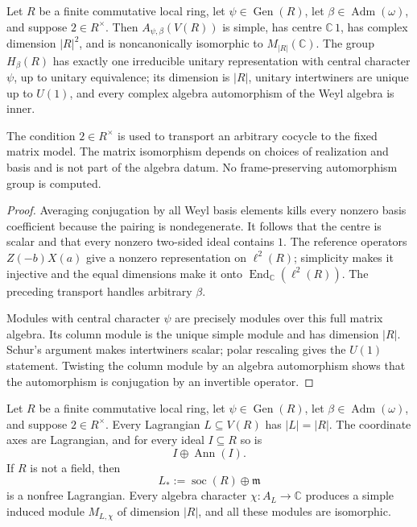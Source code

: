 \statusProvedConditional
\begin{theorem}
\label{thm:local-stone-von-neumann}
Let $R$ be a finite commutative local ring, let
$\psi\in\operatorname{Gen}(R)$, let
$\beta\in\operatorname{Adm}(\omega)$, and suppose $2\in R^\times$.  Then
$A_{\psi,\beta}(V(R))$ is simple, has centre $\mathbb C\,1$, has complex
dimension $|R|^2$, and is noncanonically isomorphic to
$M_{|R|}(\mathbb C)$.  The group $H_\beta(R)$ has exactly one irreducible
unitary representation with central character $\psi$, up to unitary
equivalence; its dimension is $|R|$, unitary intertwiners are unique up to
$U(1)$, and every complex algebra automorphism of the Weyl algebra is inner.
\end{theorem}

\begin{scope}
The condition $2\in R^\times$ is used to transport an arbitrary cocycle to
the fixed matrix model.  The matrix isomorphism depends on choices of
realization and basis and is not part of the algebra datum.  No
frame-preserving automorphism group is computed.
\end{scope}


\begin{proof}
Averaging conjugation by all Weyl basis elements kills every nonzero basis
coefficient because the pairing is nondegenerate.  It follows that the
centre is scalar and that every nonzero two-sided ideal contains $1$.
The reference operators $Z(-b)X(a)$ give a nonzero representation on
$\ell^2(R)$; simplicity makes it injective and the equal dimensions make it
onto $\operatorname{End}_{\mathbb C}(\ell^2(R))$.  The preceding transport
handles arbitrary $\beta$.

Modules with central character $\psi$ are precisely modules over this full
matrix algebra.  Its column module is the unique simple module and has
dimension $|R|$.  Schur's argument makes intertwiners scalar; polar
rescaling gives the $U(1)$ statement.  Twisting the column module by an
algebra automorphism shows that the automorphism is conjugation by an
invertible operator.
\end{proof}

\statusProvedConditional
\begin{theorem}
\label{thm:local-lagrangians}
Let $R$ be a finite commutative local ring, let
$\psi\in\operatorname{Gen}(R)$, let
$\beta\in\operatorname{Adm}(\omega)$, and suppose $2\in R^\times$.  Every
Lagrangian $L\subseteq V(R)$ has $|L|=|R|$.  The coordinate axes are
Lagrangian, and for every ideal $I\subseteq R$ so is
\[
 I\oplus\operatorname{Ann}(I).
\]
If $R$ is not a field, then
\[
 L_*:=\operatorname{soc}(R)\oplus\mathfrak m
\]
is a nonfree Lagrangian.  Every algebra character $\chi:A_L\to\mathbb C$
produces a simple induced module $M_{L,\chi}$ of dimension $|R|$, and all
these modules are isomorphic.
\end{theorem}

